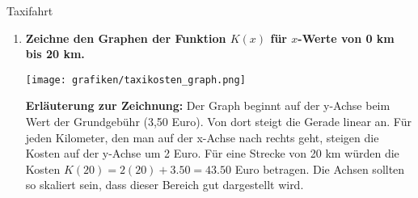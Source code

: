 \begin{loesungsumgebung}{Taxifahrt}
\begin{enumerate}
    \item \textbf{Zeichne den Graphen der Funktion $K(x)$ für $x$-Werte von 0 km bis 20 km.}
    \begin{center}
    \texttt{[image: grafiken/taxikosten\_graph.png]}
    \label{fig:taxikosten}
    \end{center}
    \textbf{Erläuterung zur Zeichnung:}
    Der Graph beginnt auf der y-Achse beim Wert der Grundgebühr (3,50 Euro). Von dort steigt die Gerade linear an. Für jeden Kilometer, den man auf der x-Achse nach rechts geht, steigen die Kosten auf der y-Achse um 2 Euro. Für eine Strecke von 20 km würden die Kosten $K(20) = 2(20) + 3.50 = 43.50$ Euro betragen. Die Achsen sollten so skaliert sein, dass dieser Bereich gut dargestellt wird.
\end{enumerate}

\end{loesungsumgebung}


